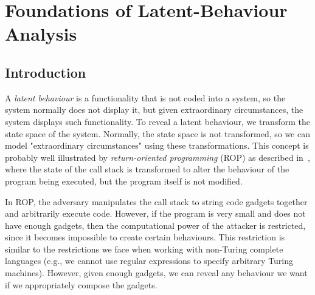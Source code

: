 

\chapter{Foundations of Latent-Behaviour Analysis} %
\label{ch:LatentBehaviours} %

\section{Introduction}
 
A \emph{latent behaviour} is a functionality that is not coded into a system, so the system normally does not display it, but given extraordinary circumstances, the system displays such functionality. To reveal a latent behaviour, we transform the state space of the system. Normally, the state space is not transformed, so we can model "extraordinary circumstances" using these transformations. This concept is probably well illustrated by \emph{return-oriented programming} (ROP) as described in~\cite{ROP}, where the state of the call stack is transformed to alter the behaviour of the program being executed, but the program itself is not modified.

In ROP, the adversary manipulates the call stack to string code gadgets together and arbitrarily execute code. However, if the program is very small and does not have enough gadgets, then the computational power of the attacker is restricted, since it becomes impossible to create certain behaviours. This restriction is similar to the restrictions we face when working with non-Turing complete languages (e.g., we cannot use regular expressions to specify arbitrary Turing machines). However, given enough gadgets, we can reveal any behaviour we want if we appropriately compose the gadgets.

